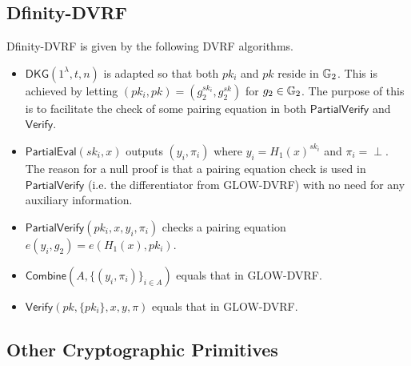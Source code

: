 \subsection{Dfinity-DVRF}
\label{appendix:dfinity-dvrf}
Dfinity-DVRF is given by the following DVRF algorithms.
\begin{itemize}
\item $\mathsf{DKG}(1^\lambda, t, n)$ is adapted so that both $pk_i$ and $pk$ reside in $\mathbb{G}_2$. This is achieved by letting $(pk_i, pk) = (g_2^{sk_i}, g_2^{sk})$ for $g_2 \in \mathbb{G}_2$. The purpose of this is to facilitate the check of some pairing equation in both $\mathsf{PartialVerify}$ and $\mathsf{Verify}$.
\item $\mathsf{PartialEval}(sk_i, x)$ outputs $(y_i, \pi_i)$ where $y_i = H_1(x)^{sk_i}$ and $\pi_i = \text{$\perp$}$. The reason for a null proof is that a pairing equation check is used in $\mathsf{PartialVerify}$ (i.e. the differentiator from GLOW-DVRF) with no need for any auxiliary information.
\item $\mathsf{PartialVerify}(pk_i, x, y_i, \pi_i)$ checks a pairing equation $e(y_i, g_2) = e(H_1(x), pk_i)$.
\item $\mathsf{Combine}(A, \{(y_i, \pi_i)\}_{i \in A})$ equals that in GLOW-DVRF.
\item $\mathsf{Verify}(pk, \{pk_i\}, x, y, \pi)$ equals that in GLOW-DVRF.
\end{itemize}

\subsection{Other Cryptographic Primitives}


